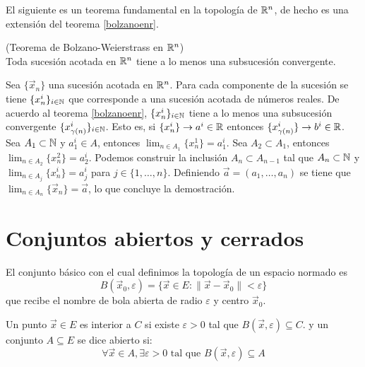 El siguiente es un teorema fundamental en la topolog\'ia de $\mathbb{R}^n$, de hecho es una extensi\'on del teorema \ref{bolzanoenr}.

\begin{teorema}{\rm (Teorema de Bolzano-Weierstrass en $\mathbb{R}^{n}$)}
\\Toda sucesi\'on acotada en $\mathbb{R}^{n}$ tiene a lo menos una subsucesi\'on convergente.
\end{teorema}

\begin{demostracion} Sea $\{\vec{x}_n\}$ una sucesi\'on acotada en $\mathbb{R}^n$. Para cada componente de la sucesi\'on se tiene $\{x_n^i\}_{i\in \mathbb{N}}$ que corresponde a una sucesi\'on acotada de n\'umeros reales. De acuerdo al teorema \ref{bolzanoenr}, $\{x_n^i\}_{i\in \mathbb{N}}$ tiene a lo menos una subsucesi\'on convergente $\{x_{\gamma (n)}^i\}_{i\in \mathbb{N}}$. Esto es, si $\{x_n^i\} \to a^i \in \mathbb{R}$ entonces $\{x_{\gamma (n)}^i\} \to b^i \in \mathbb{R}$.
\\Sea $A_1 \subset \mathbb{N}$ y $a_1^i \in A$, entonces $\lim_{n \in A_1} \{x_n^1\} = a_1^i$. Sea $A_2 \subset A_1$, entonces $\lim_{n\in A_2} \{x_n^2\} = a_2^i$. Podemos construir la inclusi\'on $A_n \subset A_{n-1}$ tal que $A_n \subset \mathbb{N}$ y $\lim_{n \in A_j} \{x_n^i\} = a_j^i$ para $j\in\{1,\ldots , n\}$. Definiendo $\vec{a}=(a_1 , \ldots , a_n)$ se tiene que $\lim_{n \in A_n} \{\vec{x}_n\} = \vec{a}$, lo que concluye la demostraci\'on. 
\end{demostracion}

\section{Conjuntos abiertos y cerrados}

El conjunto b\'asico con el cual definimos la topolog\'ia de un espacio normado es 
$$B(\vec{x}_0,\varepsilon)=\{\vec{x}\in E : \|\vec{x}-\vec{x}_0\|<\varepsilon\}$$ 
que recibe el nombre de bola abierta de radio $\varepsilon$ y centro $\vec{x}_0$.

\begin{definicion} Un punto $\vec{x}\in E$ es interior a $C$ si existe $\varepsilon > 0$ tal que $B(\vec{x},\varepsilon)\subseteq C.$ y un conjunto $A\subseteq E$ se dice abierto si:
$$\forall \vec{x}\in A,\exists\varepsilon > 0 \text{ tal que } B(\vec{x},\varepsilon)\subseteq A$$
\end{definicion}

